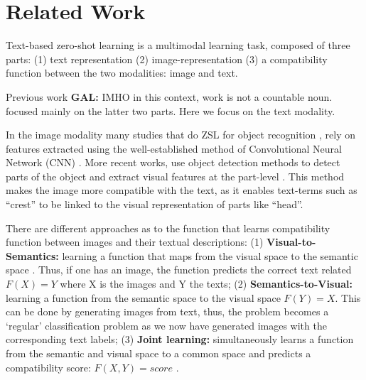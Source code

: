 \documentclass[11pt,a4paper]{article}
\newcommand\gal[1]{\textcolor{bright}{\textbf{GAL:} #1 }}
\begin{document}
\par


\section{Related Work}

Text-based zero-shot learning is a multimodal learning task, composed of three parts: (1) text representation (2) image-representation (3) a compatibility function between the two modalities: image and text. \par

Previous work \gal{IMHO in this context, work is not a countable noun.} focused mainly on the latter two parts. Here we focus on the text modality. \par

In the image modality many studies that do ZSL for object recognition \cite{xu2018attngan,lei2015predicting,qiao2016less,akata2016multi}, rely on features extracted using the well-established method of
Convolutional Neural Network (CNN) \cite{lecun1995convolutional}. More recent works, use object detection methods to detect parts of the object and extract visual features at the part-level \cite{elhoseiny2017link,zhu2018generative,zhang2016spda}. This
method makes the image more compatible with the text, as it enables text-terms such as \enquote{crest} to be linked to the visual representation of parts like \enquote{head}. \par



There are different approaches as to the function that learns compatibility function between images and their textual descriptions: (1) \textbf{Visual-to-Semantics:} learning a function that maps from the visual space to the semantic space \citep{socher2013zero}. Thus, if one has an image, the function predicts the correct text related $F(X)=Y$ where X is the images and Y the texts; (2) \textbf{Semantics-to-Visual:} learning a function from the semantic space to the visual space \citet{zhu2018generative} $F(Y)=X$. This can be done by generating images from text, thus, the problem becomes a \enquote*{regular} classification problem as we now have generated images with the corresponding text labels; (3) \textbf{Joint learning:} simultaneously learns a function from the semantic and visual space to a common space and predicts a compatibility score: $F(X,Y)=score$  \cite{akata2015evaluation,akata2016multi,qiao2016less,elhoseiny2013write,elhoseiny2016write}.\par
\end{document}
